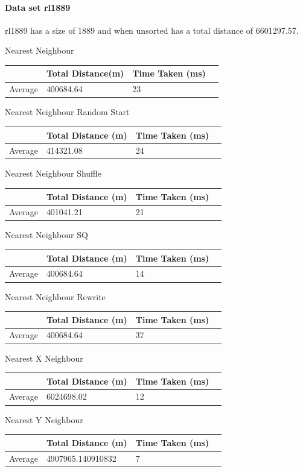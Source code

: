 \documentclass[conference,backref=page]{acmsiggraph}
\begin{document}
\paragraph{Data set rl1889} \hfill

rl1889 has a size of 1889 and when unsorted has a total distance of 6601297.57.

\begin{center}	
	
	Nearest Neighbour
	\begin{tabular}{| l | l | l | l |}
		\hline
		& Total Distance(m)& Time Taken (ms)\\ \hline
		Average & 400684.64 & 23 \\ \hline
	\end{tabular}
	
	Nearest Neighbour Random Start
	\begin{tabular}{| l | l | l | l |}
		\hline
		& Total Distance (m) & Time Taken (ms)\\ \hline
		Average & 414321.08 & 24 \\ \hline
	\end{tabular}
	
	Nearest Neighbour Shuffle
	\begin{tabular}{| l | l | l | l |}
		\hline
		& Total Distance (m) & Time Taken (ms)\\ \hline
		Average & 401041.21 & 21 \\ \hline
	\end{tabular}
	
	Nearest Neighbour SQ
	\begin{tabular}{| l | l | l | l |}
		\hline
		& Total Distance (m) & Time Taken (ms)\\ \hline
		Average & 400684.64 & 14 \\ \hline
	\end{tabular}
	
	Nearest Neighbour Rewrite
	\begin{tabular}{| l | l | l | l |}
		\hline
		& Total Distance (m) & Time Taken (ms)\\ \hline
		Average & 400684.64 & 37 \\ \hline
	\end{tabular}
	
	
	Nearest X Neighbour	
	\begin{tabular}{| l | l | l | l |}
		\hline
		& Total Distance (m) & Time Taken (ms)\\ \hline
		Average & 6024698.02 & 12 \\ \hline	
	\end{tabular}
	
	Nearest Y Neighbour	
	\begin{tabular}{| l | l | l | l |}
		\hline
		& Total Distance (m) & Time Taken (ms)\\ \hline
		Average & 4907965.140910832 & 7 \\ \hline
	\end{tabular}
\end{center}
\end{document}
